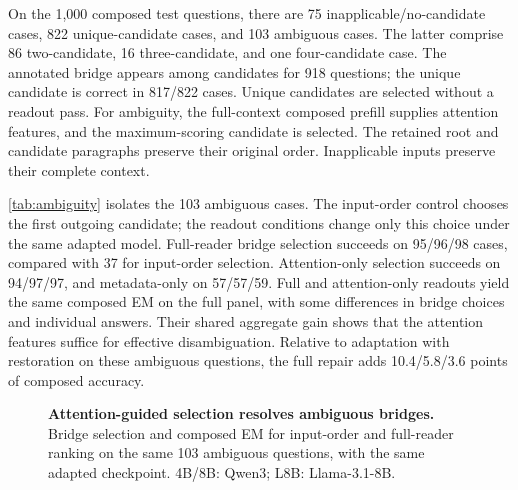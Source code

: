 On the 1,000 composed test questions, there are 75 inapplicable/no-candidate cases, 822 unique-candidate cases, and 103 ambiguous cases. The latter comprise 86 two-candidate, 16 three-candidate, and one four-candidate case. The annotated bridge appears among candidates for 918 questions; the unique candidate is correct in 817/822 cases. Unique candidates are selected without a readout pass. For ambiguity, the full-context composed prefill supplies attention features, and the maximum-scoring candidate is selected. The retained root and candidate paragraphs preserve their original order. Inapplicable inputs preserve their complete context.

\cref{tab:ambiguity} isolates the 103 ambiguous cases. The input-order control chooses the first outgoing candidate; the readout conditions change only this choice under the same adapted model. Full-reader bridge selection succeeds on 95/96/98 cases, compared with 37 for input-order selection. Attention-only selection succeeds on 94/97/97, and metadata-only on 57/57/59. Full and attention-only readouts yield the same composed EM on the full panel, with some differences in bridge choices and individual answers. Their shared aggregate gain shows that the attention features suffice for effective disambiguation. Relative to adaptation with restoration on these ambiguous questions, the full repair adds 10.4/5.8/3.6 points of composed accuracy.

\begin{table}[!htbp]
  \centering
  \caption{\textbf{Where the attention readout changes evidence selection.} Results on the 103 composed questions whose input-derived graph has multiple candidates. Every ranking condition uses the same adapted model and retains the root plus one candidate paragraph. Bridge accuracy is evaluated against annotations only after selection. Values are percentages, mean $\pm$ sample SD. The full readout and input-order control produce identical generated token sequences on all other 897 questions in every recorded run.}
  \label{tab:ambiguity}
  \small\setlength{\tabcolsep}{8pt}
  
\end{table}

\begin{figure}[!htbp]
  \centering
  \begin{minipage}{.70\textwidth}\centering
  \par
  \caption{\textbf{Attention-guided selection resolves ambiguous bridges.} Bridge selection and composed EM for input-order and full-reader ranking on the same 103 ambiguous questions, with the same adapted checkpoint. 4B/8B: Qwen3; L8B: Llama-3.1-8B.}
  \label{fig:ambiguity_main}
\end{minipage}
\end{figure}

